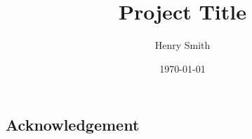 \documentclass{article}
\title{\textbf{Project Title}}
\author[]{Henry Smith}
\affil[]{\normalsize Yale University}
\date{\today}
\begin{document}
\maketitle

\begin{abstract}

\end{abstract}

\pagebreak

\vspace*{\fill}

\begin{centering}
\section*{Acknowledgement}
\end{centering}

\vspace*{\fill}

\pagebreak

\vspace*{\fill}

\begin{centering}
\tableofcontents
\end{centering}

\vspace*{\fill}

\pagebreak

\pagebreak



\end{document}
